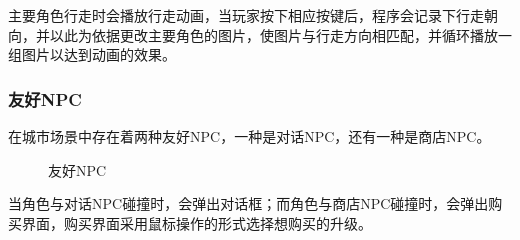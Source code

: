 \documentclass{ctexart}
\begin{document}
主要角色行走时会播放行走动画，当玩家按下相应按键后，程序会记录下行走朝向，并以此为依据更改主要角色的图片，使图片与行走方向相匹配，并循环播放一组图片以达到动画的效果。

\subsubsection{友好NPC}
在城市场景中存在着两种友好NPC，一种是对话NPC，还有一种是商店NPC。
\begin{figure}[h]
\centering
{}
\caption{\label{fig:友好NPC}友好NPC}
\end{figure}

当角色与对话NPC碰撞时，会弹出对话框；而角色与商店NPC碰撞时，会弹出购买界面，购买界面采用鼠标操作的形式选择想购买的升级。
\end{document}
